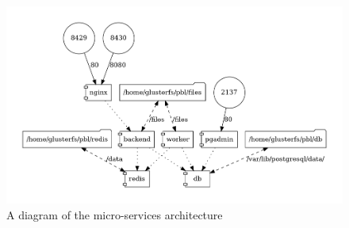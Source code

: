 \documentclass[a4paper,10pt]{article}
\begin{document}
\begin{figure}[H]
  \includegraphics[scale=.5]{fig13.png}
  \centering
  \caption{A diagram of the micro-services architecture}
  \label{microservices}
\end{figure}
\end{document}
